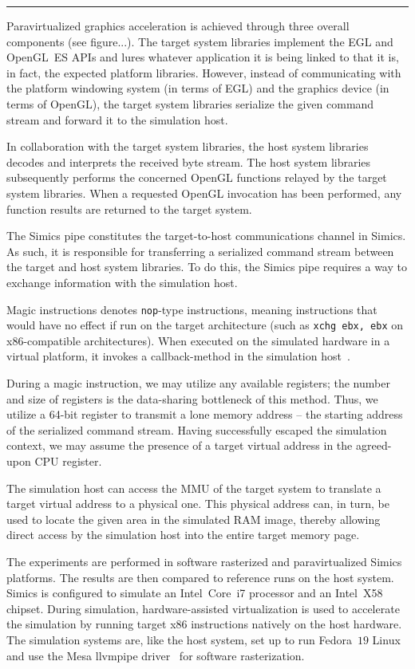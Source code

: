 \documentclass{article}
\newcommand{\masccite}[2][]{\cite{#2}}
\newcommand{\masccodeinline}[1]{\colorbox{black!5}{\lstinline[basicstyle=\ttfamily\color{black}]{#1}}}
\begin{document}
\noindent\rule{8cm}{0.4pt}

Paravirtualized graphics acceleration is achieved through three overall components (see figure...).
The target system libraries implement the EGL and OpenGL~ES APIs and lures whatever application it is being linked to that it is, in fact, the expected platform libraries.
However, instead of communicating with the platform windowing system (in terms of EGL) and the graphics device (in terms of OpenGL), the target system libraries serialize the given command stream and forward it to the simulation host.

In collaboration with the target system libraries, the host system libraries decodes and interprets the received byte stream.
The host system libraries subsequently performs the concerned OpenGL functions relayed by the target system libraries.
When a requested OpenGL invocation has been performed, any function results are returned to the target system.

The Simics pipe constitutes the target-to-host communications channel in Simics.
As such, it is responsible for transferring a serialized command stream between the target and host system libraries.
To do this, the Simics pipe requires a way to exchange information with the simulation host.

Magic instructions denotes \masccodeinline{nop}-type instructions, meaning instructions that would have no effect if run on the target architecture (such as \masccodeinline{xchg ebx, ebx} on x86-compatible architectures).
When executed on the simulated hardware in a virtual platform, it invokes a callback-method in the simulation host~\masccite[p.~32]{publications:leupers:2010}.

During a magic instruction, we may utilize any available registers; the number and size of registers is the data-sharing bottleneck of this method.
Thus, we utilize a 64-bit register to transmit a lone memory address -- the starting address of the serialized command stream.
Having successfully escaped the simulation context, we may assume the presence of a target virtual address in the agreed-upon CPU register.

The simulation host can access the MMU of the target system to translate a target virtual address to a physical one.
This physical address can, in turn, be used to locate the given area in the simulated RAM image, thereby allowing direct access by the simulation host into the entire target memory page.

The experiments are performed in software rasterized and paravirtualized Simics platforms.
The results are then compared to reference runs on the host system.
Simics is configured to simulate an Intel\circledR ~Core\texttrademark ~i7 processor and an Intel\circledR ~X58 chipset.
During simulation, hardware-assisted virtualization is used to accelerate the simulation by running target x86 instructions natively on the host hardware.
The simulation systems are, like the host system, set up to run Fedora~$19$ Linux and use the Mesa llvmpipe driver~\masccite{web:mesa:2015} for software rasterization.
\end{document}
